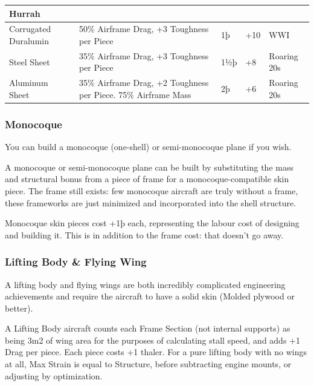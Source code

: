 \documentclass{article}
\begin{document}
\begin{tabular}{|l|l|l|l|l|}
    Hurrah                                                                                                                      \\\hline
    Corrugated Duralumin         & 50\% Airframe Drag, +3 Toughness per Piece              & 1þ         &
    +10                          & WWI                                                                                          \\\hline
    Steel Sheet                  & 35\% Airframe Drag, +3 Toughness per Piece              & 1½þ        & +8          &
    Roaring 20s                                                                                                                 \\\hline
    Aluminum Sheet               & 35\% Airframe Drag, +2 Toughness per Piece. 75\%
    Airframe Mass                & 2þ                                                      & +6         & Roaring 20s           \\\hline
\end{tabular}

\subsubsection{Monocoque}
\label{_Monocoque}

You can build a monocoque (one-shell) or semi-monocoque plane if you
wish.

A monocoque or semi-monocoque plane can be built by substituting the
mass and structural bonus from a piece of frame for a
monocoque-compatible skin piece. The frame still exists: few monocoque
aircraft are truly without a frame, these frameworks are just minimized
and incorporated into the shell structure.

Monocoque skin pieces cost +1þ each, representing the labour cost of
designing and building it. This is in addition to the frame cost: that
doesn't go away.

\subsubsection{Lifting Body \& Flying Wing}
\label{_Lifting Body \& Flying Wing}

A lifting body and flying wings are both incredibly complicated
engineering achievements and require the aircraft to have a solid skin
(Molded plywood or better).

A Lifting Body aircraft counts each Frame Section (not internal
supports) as being 3m2 of wing area for the purposes of calculating
stall speed, and adds +1 Drag per piece. Each piece costs +1 thaler. For
a pure lifting body with no wings at all, Max Strain is equal to
Structure, before subtracting engine mounts, or adjusting by
optimization.
\end{document}
